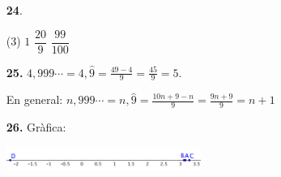 \documentclass[a4paper, pdf, twoside]{book}
\begin{document}
\begin{multicols}{2}
\begin{enumerate}

 \item[\fontfamily{phv}\selectfont\color{blue}\textbf{24}. ]  \scalebox{0.6}{\simbolclau } 
 \begin{tasks}[column-sep=1em, item-indent=1.3333em](3)
	 \task $1$
	 \task $\dfrac {20}{9}$
	 \task $\dfrac {99}{100}$
\end{tasks}
\vspace{0.25cm}
\item[\fontfamily{phv}\selectfont\color{blue}\textbf{25. }] 
$4,999{\cdots }=4,\hat {9}=\frac {49-4}{9}=\frac {45}{9}=5$.\par En general: $n,999{\cdots }=n,\hat {9}=\frac {10n+9-n}{9}=\frac {9n+9}{9}=n+1$ 
\vspace{0.25cm}
\item[\fontfamily{phv}\selectfont\color{blue}\textbf{26. }] 
Gràfica:\par \includegraphics [width=0.5\textwidth ]{img-sol/t1-recta3}
 \end{enumerate}
\vspace{0.3cm}



\end{multicols}
\end{document}
